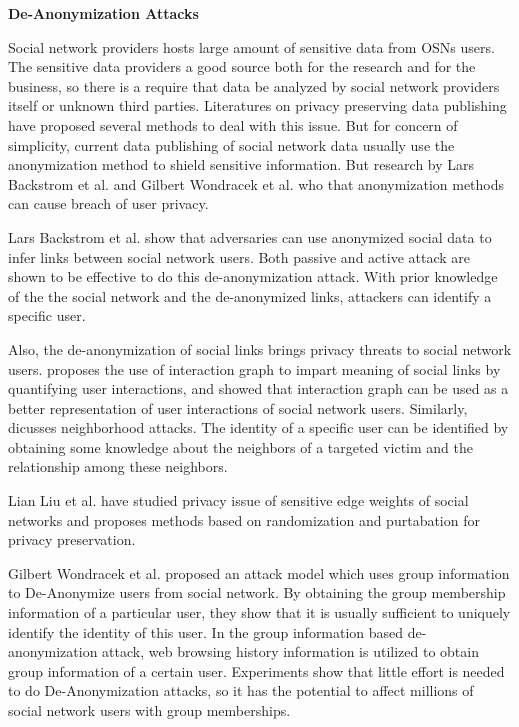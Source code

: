 \documentclass[12pt]{article}
\begin{document}
\textbf{De-Anonymization Attacks}

Social network providers hosts large amount of sensitive data from
OSNs users. The sensitive data providers a good source both for the
research and for the business, so there is a require that data be
analyzed by social network providers itself or unknown third
parties. Literatures on privacy preserving data publishing
\cite{ppdp-survey} have proposed several methods to deal with this
issue. But for concern of simplicity, current data publishing of
social network data usually use the anonymization method to shield
sensitive information. But research by Lars Backstrom 
et al. \cite{anony-link-attack} and Gilbert Wondracek et al.
\cite{group-deanonymization-attack} who that anonymization methods can
cause breach of user privacy. 

Lars Backstrom et al. \cite{anony-link-attack} show that adversaries
can use anonymized social data to infer links between social network
users. Both passive and active attack are shown to be effective to do
this de-anonymization attack. With prior knowledge of the the social
network and the de-anonymized links, attackers can identify a specific
user. 

Also, the de-anonymization of social links brings privacy threats to
social network users.  \cite{user-interaction-social-link} proposes
the use of interaction graph to impart meaning of social links by
quantifying user interactions, and showed that interaction graph can
be used as a better representation of user interactions of social
network users. Similarly, \cite{neighborhood-attack} dicusses
neighborhood attacks. The identity of a specific user can be
identified by obtaining some knowledge about the neighbors of a
targeted victim and the relationship among these neighbors.

Lian Liu et al.\cite{privacy-sensitive-edge} have studied privacy
issue of sensitive edge weights of social networks and proposes
methods based on randomization and purtabation for privacy
preservation.

Gilbert Wondracek et al.\cite{group-deanonymization-attack} proposed an
attack model which uses group information to De-Anonymize users from
social network. By obtaining the group membership information of a
particular user, they show that it is usually sufficient to uniquely
identify the identity of this user. In the group information based
de-anonymization attack, web browsing history information is utilized
to obtain group information of a certain user. Experiments show that
little effort is needed to do De-Anonymization attacks, so it has the
potential to affect millions of social network users with group
memberships.
\end{document}
